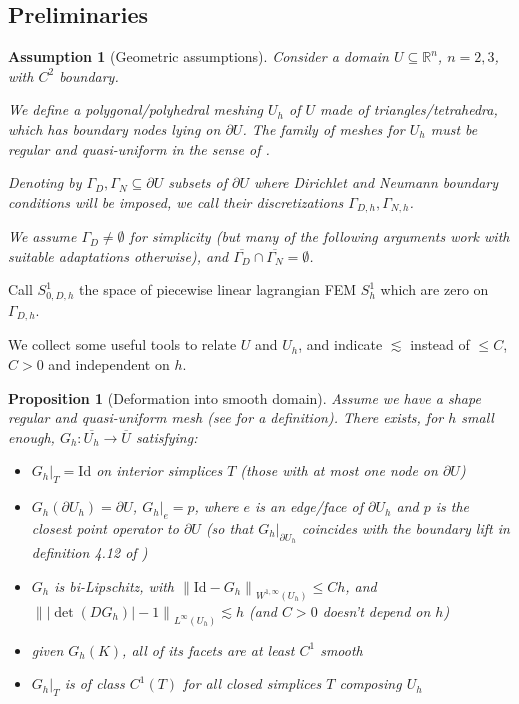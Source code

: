 \documentclass[english,a4paper,9pt,oneside]{scrbook}	%
\theoremstyle{break}
\newtheorem{prop}[equation]{Proposition}
\newtheorem{ass}[equation]{Assumption}
\theoremstyle{remark}
\newcommand{\mR}{\mathbb{R}}
\newcommand{\norm}[1]{\left\lVert#1\right\rVert}
\newcommand{\id}{\text{Id}}
\begin{document}
\begin{appendices}
\section{Preliminaries}

\begin{ass}[Geometric assumptions]
\label{ass:geo_ass_discr}
Consider a domain $U \subseteq \mR^n$, $n=2,3$, with $C^2$ boundary.

We define a polygonal/polyhedral meshing $U_h$ of $U$ made of triangles/tetrahedra, which has boundary nodes lying on $\partial U$. The family of meshes for $U_h$ must be regular and quasi-uniform in the sense of \cite{brenner_scott}.

Denoting by $\Gamma_D, \Gamma_N \subseteq \partial U$ subsets of $\partial U$ where Dirichlet and Neumann boundary conditions will be imposed, we call their discretizations $\Gamma_{D,h}, \Gamma_{N,h}$.

We assume $\Gamma_D \neq \emptyset $ for simplicity (but many of the following arguments work with suitable adaptations otherwise), and $\overline{\Gamma_D}\cap \overline{\Gamma_N} = \emptyset$.

\end{ass}

Call $S^1_{0,D,h} $ the space of piecewise linear lagrangian FEM $S^1_h$ which are zero on $\Gamma_{D,h}$.

We collect some useful tools to relate $U$ and $U_h$, and indicate $\lesssim$ instead of $\leq C$, $C>0$ and independent on $h$.

\begin{prop}[Deformation into smooth domain]
\label{prop:G_h}
Assume we have a shape regular and quasi-uniform mesh (see \cite{brenner_scott} for a definition). There exists, for $h$ small enough, $G_h: \overline{U_h} \rightarrow \overline{U}$ satisfying:

\begin{itemize}
	\item $G_h|_T = \id$ on interior simplices $T$ (those with at most one node on $\partial U$)
	\item $G_h(\partial U_h) = \partial U$, $G_h|_e=p$, where $e$ is an edge/face of $\partial U_h$ and $p$ is the closest point operator to $\partial U$ (so that $G_h|_{\partial U_h}$ coincides with the boundary lift in definition 4.12 of \cite{elliott})
	\item $G_h$ is bi-Lipschitz, with $\norm{\id -G_h}_{W^{1,\infty}(U_h)}\leq C h$, and $\norm{|\det(DG_h)|-1}_{L^\infty(U_h)}\lesssim h$ (and $C>0$ doesn't depend on $h$)
	\item given $G_h(K)$, all of its facets are at least $C^1$ smooth
	\item $G_h|_T$ is of class $C^1(T)$ for all closed simplices $T$ composing $U_h$
\end{itemize}


\end{prop}
\end{appendices}
\end{document}
